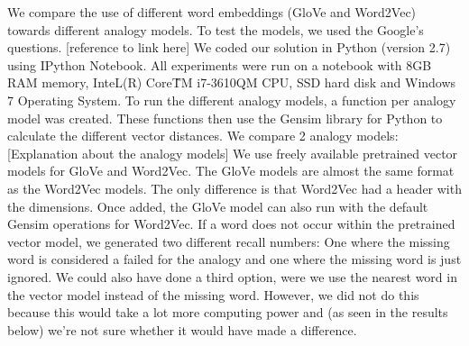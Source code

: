 We compare the use of different word embeddings (GloVe and Word2Vec) towards different analogy models. To test the models, we used the Google's questions. [reference to link here]
\newline
We coded our solution in Python (version 2.7) using IPython Notebook. All experiments were run on a notebook with 8GB RAM memory, InteL(R) Core\^{TM} i7-3610QM CPU, SSD hard disk and Windows 7 Operating System.
\newline
To run the different analogy models, a function per analogy model was created. These functions then use the Gensim library for Python to calculate the different vector distances.
\newline
We compare 2 analogy models:
[Explanation about the analogy models]
\newline
We use freely available pretrained vector models for GloVe and Word2Vec. The GloVe models are almost the same format as the Word2Vec models. The only difference is that Word2Vec had a header with the dimensions. Once added, the GloVe model can also run with the default Gensim operations for Word2Vec.
\newline
If a word does not occur within the pretrained vector model, we generated two different recall numbers: One where the missing word is considered a failed for the analogy and one where the missing word is just ignored. We could also have done a third option, were we use the nearest word in the vector model instead of the missing word. However, we did not do this because this would take a lot more computing power and (as seen in the results below) we're not sure whether it would have made a difference.